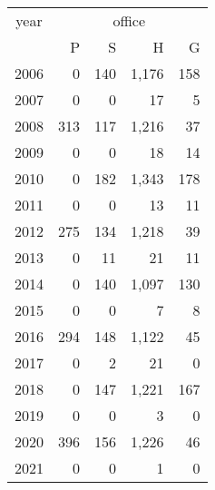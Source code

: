 \footnotesize\begin{tabular}[t]{lrrrr}
\toprule
\multicolumn{1}{c}{year} & \multicolumn{4}{c}{office} \\
\cmidrule(l{3pt}r{3pt}){1-1} \cmidrule(l{3pt}r{3pt}){2-5}
  & P & S & H & G\\
\midrule
2006 & 0 & 140 & 1,176 & 158\\
2007 & 0 & 0 & 17 & 5\\
2008 & 313 & 117 & 1,216 & 37\\
2009 & 0 & 0 & 18 & 14\\
2010 & 0 & 182 & 1,343 & 178\\
2011 & 0 & 0 & 13 & 11\\
2012 & 275 & 134 & 1,218 & 39\\
2013 & 0 & 11 & 21 & 11\\
2014 & 0 & 140 & 1,097 & 130\\
2015 & 0 & 0 & 7 & 8\\
2016 & 294 & 148 & 1,122 & 45\\
2017 & 0 & 2 & 21 & 0\\
2018 & 0 & 147 & 1,221 & 167\\
2019 & 0 & 0 & 3 & 0\\
2020 & 396 & 156 & 1,226 & 46\\
2021 & 0 & 0 & 1 & 0\\
\bottomrule
\end{tabular}
